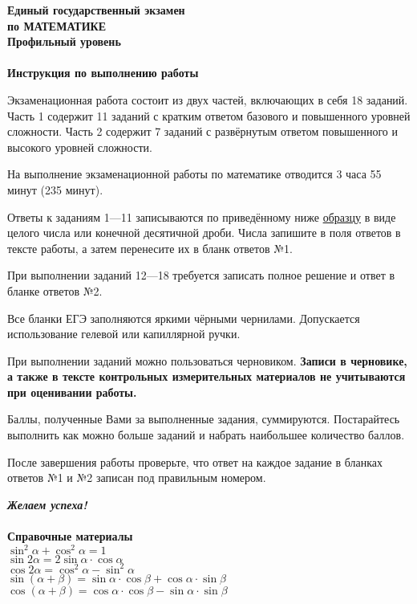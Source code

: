 
\begin{center}
	\textbf{
		Единый государственный экзамен\\по МАТЕМАТИКЕ\\Профильный уровень\\ \qquad \\ Инструкция по выполнению работы
	}
\end{center}


\par \qquad Экзаменационная работа состоит из двух частей, включающих в себя 18 заданий. Часть 1 содержит 11 заданий с кратким ответом базового и повышенного уровней сложности. Часть 2 содержит 7 заданий с развёрнутым ответом повышенного и высокого уровней сложности.
\par \qquad На выполнение экзаменационной работы по математике отводится 3 часа 55 минут (235 минут).
\par \qquad Ответы к заданиям 1—11 записываются по приведённому ниже \underline {образцу} в виде целого числа или конечной десятичной дроби. Числа запишите в поля ответов в тексте работы, а затем перенесите их в бланк ответов №1.
\par \qquad При выполнении заданий 12—18 требуется записать полное решение и ответ в бланке ответов №2.
\par \qquad  Все бланки ЕГЭ заполняются яркими чёрными чернилами. Допускается использование гелевой или капиллярной ручки.
\par \qquad При выполнении заданий можно пользоваться черновиком. \textbf{Записи в черновике, а также в тексте контрольных измерительных материалов не учитываются при оценивании работы.}
\par \qquad  Баллы, полученные Вами за выполненные задания, суммируются. Постарайтесь выполнить как можно больше заданий и набрать наибольшее количество баллов.
\par \qquad После завершения работы проверьте, что ответ на каждое задание в бланках ответов №1 и №2 записан под правильным номером.
\begin{center}
	\textit{\textbf{Желаем успеха!}}\\ \qquad \\\textbf{ Справочные материалы} \\
$\sin^2 \alpha + \cos^2 \alpha = 1$ \\
$\sin 2\alpha=2\sin \alpha \cdot \cos \alpha$ \\
$\cos 2\alpha=\cos^2 \alpha-\sin^2 \alpha$ \\
$\sin (\alpha+\beta)=\sin \alpha \cdot \cos \beta+\cos \alpha \cdot \sin\beta$ \\
$\cos (\alpha+\beta)=\cos \alpha \cdot \cos \beta-\sin\alpha \cdot \sin\beta$
\end{center}
